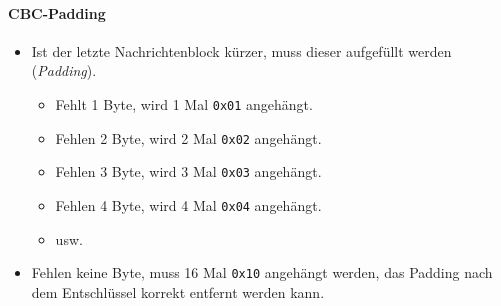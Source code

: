                 \paragraph{CBC-Padding}
                    \begin{itemize}
                    	\item Ist der letzte Nachrichtenblock kürzer, muss dieser aufgefüllt werden (\textit{Padding}).
                        	\begin{itemize}
                        		\item Fehlt 1 Byte, wird 1 Mal \texttt{0x01} angehängt.
                        		\item Fehlen 2 Byte, wird 2 Mal \texttt{0x02} angehängt.
                        		\item Fehlen 3 Byte, wird 3 Mal \texttt{0x03} angehängt.
                        		\item Fehlen 4 Byte, wird 4 Mal \texttt{0x04} angehängt.
                        		\item usw.
                        	\end{itemize}
                    	\item Fehlen keine Byte, muss 16 Mal \texttt{0x10} angehängt werden, das Padding nach dem Entschlüssel korrekt entfernt werden kann.
                    \end{itemize}
                
